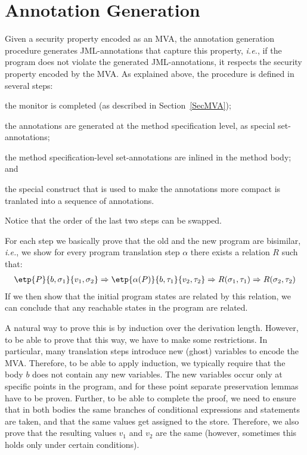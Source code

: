 \section{Annotation Generation}\label{SecAnnotGen} 

Given a security property encoded as an MVA, the annotation generation
procedure generates JML-annotations that capture this property,
\emph{i.e.}, if the program does not violate the generated
JML-annotations, it respects the security property encoded by the
MVA. As explained above, the procedure is defined in several steps:
\begin{inparaenum}
\item the monitor is completed (as described in Section~\ref{SecMVA});
\item the annotations are generated at the method specification level,
as special set-annotations;
\item the method specification-level set-annotations are inlined in
the method body; and
\item the special \CaseJML construct that is used to make the
annotations more compact is tranlated into a sequence of \Set
annotations.
\end{inparaenum} 
Notice that the order of the last two steps can be swapped.

For each step we basically prove that the old and the new program are
bisimilar, \emph{i.e.}, we show for every program translation step
\(\alpha\) there exists a relation \(R\) such that:
\[
\begin{array}{l}
\etp{P}{b,\sigma_1}{v_1, \sigma_2} \Rightarrow
\etp{\alpha(P)}{b, \tau_1}{v_2, \tau_2} \Rightarrow
R(\sigma_1, \tau_1) \Rightarrow
R(\sigma_2, \tau_2) 
\end{array}
\]
If we then show that the initial program states are related by this
relation, we can conclude that any reachable states in the program are
related. 

A natural way to prove this is by induction over the derivation
length. However, to be able to prove that this way, we have to make
some restrictions. In particular, many translation steps introduce new
(ghost) variables to encode the MVA. Therefore, to be able to apply
induction, we typically require that the body \(b\) does not contain
any new variables. The new variables occur only at specific points in
the program, and for these point separate preservation lemmas have to
be proven. Further, to be able to complete the proof, we need to
ensure that in both bodies the same branches of conditional
expressions and statements are taken, and that the same values get
assigned to the store. Therefore, we also prove that the resulting
values \(v_1\) and \(v_2\) are the same (however, sometimes this holds
only under certain conditions).



